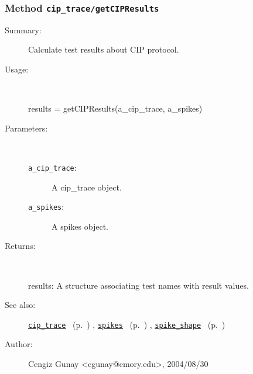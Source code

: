 \subsubsection[Method \texttt{getCIPResults}]{Method \texttt{cip\_trace/getCIPResults}}%
%
\label{ref_cip_trace__getCIPResults}%
\hypertarget{ref_cip_trace__getCIPResults}{}%
\begin{description}
\item[Summary:]Calculate test results about CIP protocol.
%
\item[Usage:]~%
\begin{lyxcode}%
results = getCIPResults(a\_cip\_trace, a\_spikes)
%
\end{lyxcode}%
%
%
\item[Parameters:]~
\begin{description}%
\item[\texttt{a\_cip\_trace}:]
 A cip\_trace object.
\item[\texttt{a\_spikes}:]
 A spikes object.
\end{description}%
%
\item[Returns:
]~

	results: A structure associating test names with result values.
%
%
\item[See also:]%
\hyperlink{ref_cip_trace}{\texttt{cip\_trace}}%
\ (p.~\pageref{ref_cip_trace})%
%
, \hyperlink{ref_spikes}{\texttt{spikes}}%
\ (p.~\pageref{ref_spikes})%
%
, \hyperlink{ref_spike_shape}{\texttt{spike\_shape}}%
\ (p.~\pageref{ref_spike_shape})%
%
%
\item[Author:]%
Cengiz Gunay <cgunay@emory.edu>, 2004/08/30
%
\end{description}
\methodline%
